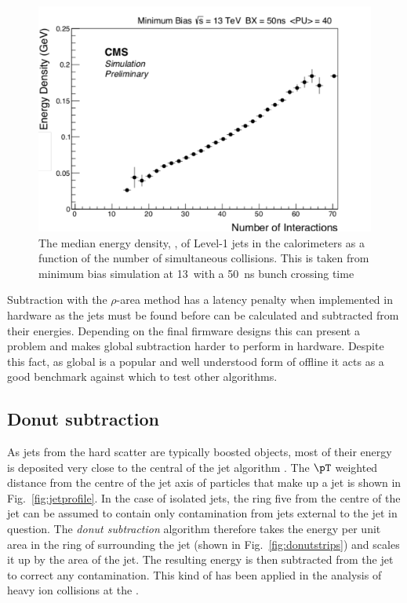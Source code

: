 \begin{figure}
	\begin{center}
		\includegraphics[width=0.8\linewidth]{figs/trigger/medianEdited}
  \caption{The median energy density, \rho, of Level-1 jets in the \CMS
  calorimeters as a function of the number of simultaneous collisions.
  This is taken from minimum bias \MC simulation at 13~\tev with a
  50~ns bunch crossing time}
	\label{fig:rho}
	\end{center}
\end{figure}

Subtraction with the $\rho$-area method has a latency penalty when
implemented in hardware as the jets must be found before \rho can be
calculated and subtracted from their energies. Depending on the final
firmware designs this can present a problem and makes global \rho
subtraction harder to perform in hardware. Despite this fact, as
global \rho is a popular and well understood form of offline \PUS it
acts as a good benchmark against which to test other algorithms.

\subsection{Donut subtraction}

As jets from the hard scatter are typically boosted objects, most of
their energy is deposited very close to the central \TT of the jet
algorithm \cite{JetProfile_pileup}. The $\pT$ weighted distance from
the centre of the jet axis of particles that make up a jet is shown in
Fig.~\ref{fig:jetprofile}. In the case of isolated jets, the ring five
\TTs from the centre of the jet can be assumed to contain only
contamination from \PU jets external to the jet in question.  The
\emph{donut subtraction} algorithm therefore takes the energy per unit
area in the ring of \TTs surrounding the jet (shown in
Fig.~\ref{fig:donutstrips}) and scales it up by the area of the jet.
The resulting energy is then subtracted from the jet to correct any
\PU contamination. This kind of \PUS has
been applied in the analysis of heavy ion collisions at the \LHC
\cite{Cacciari:2010te}.

